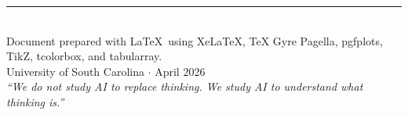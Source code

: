 \documentclass[11pt, a4paper]{article}
\begin{document}
\vfill
\begin{center}
{\color{faded}\rule{0.5\textwidth}{0.5pt}}\\[8pt]
{\small\sffamily\color{faded} Document prepared with \LaTeX\ using XeLaTeX, TeX Gyre Pagella, pgfplots, TikZ, tcolorbox, and tabularray.\\
University of South Carolina $\cdot$ April 2026\\[4pt]
\textit{``We do not study AI to replace thinking. We study AI to understand what thinking is.''}}
\end{center}
\end{document}
